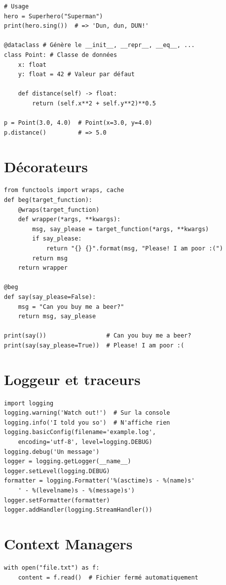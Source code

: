 \documentclass{article}
\begin{document}
\begin{multicols*}{4}
\begin{lstlisting}
# Usage
hero = Superhero("Superman")
print(hero.sing())  # => 'Dun, dun, DUN!'

@dataclass # Génère le __init__, __repr__, __eq__, ...
class Point: # Classe de données
    x: float
    y: float = 42 # Valeur par défaut
    
    def distance(self) -> float:
        return (self.x**2 + self.y**2)**0.5

p = Point(3.0, 4.0)  # Point(x=3.0, y=4.0)
p.distance()         # => 5.0
\end{lstlisting}

\section*{Décorateurs}
\begin{lstlisting}
from functools import wraps, cache
def beg(target_function):
    @wraps(target_function)
    def wrapper(*args, **kwargs):
        msg, say_please = target_function(*args, **kwargs)
        if say_please:
            return "{} {}".format(msg, "Please! I am poor :(")
        return msg
    return wrapper

@beg
def say(say_please=False):
    msg = "Can you buy me a beer?"
    return msg, say_please

print(say())                 # Can you buy me a beer?
print(say(say_please=True))  # Please! I am poor :(
\end{lstlisting}

\section*{Loggeur et traceurs}
\begin{lstlisting}
import logging
logging.warning('Watch out!')  # Sur la console
logging.info('I told you so')  # N'affiche rien
logging.basicConfig(filename='example.log',
    encoding='utf-8', level=logging.DEBUG)
logging.debug('Un message')
logger = logging.getLogger(__name__)
logger.setLevel(logging.DEBUG)
formatter = logging.Formatter('%(asctime)s - %(name)s'
    ' - %(levelname)s - %(message)s')
logger.setFormatter(formatter)
logger.addHandler(logging.StreamHandler())
\end{lstlisting}

\section*{Context Managers}
\begin{lstlisting}
with open("file.txt") as f:
    content = f.read()  # Fichier fermé automatiquement


\end{lstlisting}
\end{multicols*}
\end{document}
